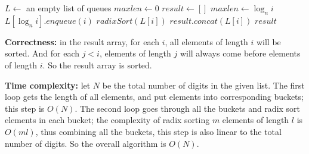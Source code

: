 \documentclass{article}
\begin{document}
\begin{description}
\begin{algorithm}[H]
\begin{algorithmic}[1]
      \State $L \gets $ an empty list of queues
      \State $maxlen \gets 0$
      \State $result \gets []$
          \State $maxlen \gets \log_{n}{i}$
        \EndIf
        \State $L[\log_{n}{i}].enqueue(i)$
      \EndFor
        \State $radixSort(L[i])$
        \State $result.concat(L[i])$
      \EndFor
      \State \Return $result$
    \EndFunction

    \end{algorithmic}
  \end{algorithm}

  \textbf{Correctness:} in the result array, for each $i$, all elements of length $i$ will be sorted. And for each $j < i$, elements of length $j$ will always come before elements of length $i$. So the result array is sorted.

  \textbf{Time complexity:} let $N$ be the total number of digits in the given list. The first loop gets the length of all elements, and put elements into corresponding buckets; this step is $O(N)$. The second loop goes through all the buckets and radix sort elements in each bucket; the complexity of radix sorting $m$ elements of length $l$ is $O(ml)$, thus combining all the buckets, this step is also linear to the total number of digits. So the overall algorithm is $O(N)$.

\end{description}
\end{document}
